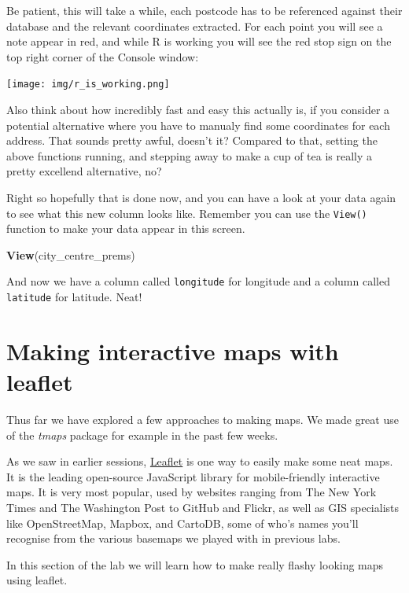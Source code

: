 \documentclass[]{book}
\newenvironment{Shaded}{\begin{snugshade}}{\end{snugshade}}
\newcommand{\KeywordTok}[1]{\textcolor[rgb]{0.13,0.29,0.53}{\textbf{#1}}}
\newcommand{\NormalTok}[1]{#1}
\begin{document}
Be patient, this will take a while, each postcode has to be referenced against their database and the relevant coordinates extracted. For each point you will see a note appear in red, and while R is working you will see the red stop sign on the top right corner of the Console window:

\texttt{[image: img/r\_is\_working.png]}

Also think about how incredibly fast and easy this actually is, if you consider a potential alternative where you have to manualy find some coordinates for each address. That sounds pretty awful, doesn't it? Compared to that, setting the above functions running, and stepping away to make a cup of tea is really a pretty excellend alternative, no?

Right so hopefully that is done now, and you can have a look at your data again to see what this new column looks like. Remember you can use the \texttt{View()} function to make your data appear in this screen.

\begin{Shaded}
\begin{Highlighting}[]
\KeywordTok{View}\NormalTok{(city_centre_prems)}
\end{Highlighting}
\end{Shaded}

And now we have a column called \texttt{longitude} for longitude and a column called \texttt{latitude} for latitude. Neat!

\hypertarget{making-interactive-maps-with-leaflet}{%
\section{Making interactive maps with leaflet}\label{making-interactive-maps-with-leaflet}}

Thus far we have explored a few approaches to making maps. We made great use of the \emph{tmaps} package for example in the past few weeks.

As we saw in earlier sessions, \href{http://leafletjs.com/}{Leaflet} is one way to easily make some neat maps. It is the leading open-source JavaScript library for mobile-friendly interactive maps. It is very most popular, used by websites ranging from The New York Times and The Washington Post to GitHub and Flickr, as well as GIS specialists like OpenStreetMap, Mapbox, and CartoDB, some of who's names you'll recognise from the various basemaps we played with in previous labs.

In this section of the lab we will learn how to make really flashy looking maps using leaflet.
\end{document}
